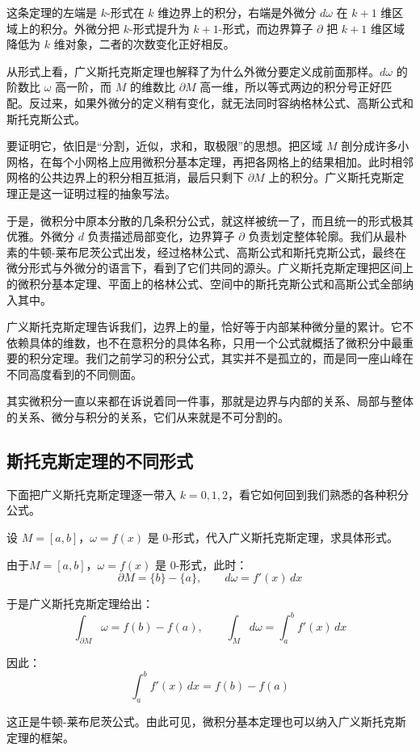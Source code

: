 这条定理的左端是 \(k\)-形式在 \(k\) 维边界上的积分，右端是外微分 \(d\omega\) 在 \(k+1\) 维区域上的积分。外微分把 \(k\)-形式提升为 \(k+1\)-形式，而边界算子 \(\partial\) 把 \(k+1\) 维区域降低为 \(k\) 维对象，二者的次数变化正好相反。

从形式上看，广义斯托克斯定理也解释了为什么外微分要定义成前面那样。\(d\omega\) 的阶数比 \(\omega\) 高一阶，而 \(M\) 的维数比 \(\partial M\) 高一维，所以等式两边的积分号正好匹配。反过来，如果外微分的定义稍有变化，就无法同时容纳格林公式、高斯公式和斯托克斯公式。

要证明它，依旧是“分割，近似，求和，取极限”的思想。把区域 \(M\) 剖分成许多小网格，在每个小网格上应用微积分基本定理，再把各网格上的结果相加。此时相邻网格的公共边界上的积分相互抵消，最后只剩下 \(\partial M\) 上的积分。广义斯托克斯定理正是这一证明过程的抽象写法。

于是，微积分中原本分散的几条积分公式，就这样被统一了，而且统一的形式极其优雅。外微分 \(d\) 负责描述局部变化，边界算子 \(\partial\) 负责划定整体轮廓。我们从最朴素的牛顿-莱布尼茨公式出发，经过格林公式、高斯公式和斯托克斯公式，最终在微分形式与外微分的语言下，看到了它们共同的源头。广义斯托克斯定理把区间上的微积分基本定理、平面上的格林公式、空间中的斯托克斯公式和高斯公式全部纳入其中。

广义斯托克斯定理告诉我们，边界上的量，恰好等于内部某种微分量的累计。它不依赖具体的维数，也不在意积分的具体名称，只用一个公式就概括了微积分中最重要的积分定理。我们之前学习的积分公式，其实并不是孤立的，而是同一座山峰在不同高度看到的不同侧面。

其实微积分一直以来都在诉说着同一件事，那就是边界与内部的关系、局部与整体的关系、微分与积分的关系，它们从来就是不可分割的。
\subsection{斯托克斯定理的不同形式}
下面把广义斯托克斯定理逐一带入 \(k=0,1,2\)，看它如何回到我们熟悉的各种积分公式。

\begin{myexample}
  设 \(M=[a,b]\)，\(\omega=f(x)\) 是 \(0\)-形式，代入广义斯托克斯定理，求具体形式。
  
  由于\(M=[a,b]\)，\(\omega=f(x)\) 是 \(0\)-形式，此时：
\[
\partial M=\{b\}-\{a\},\qquad d\omega=f'(x)\,dx
\]

于是广义斯托克斯定理给出：
\[
\int_{\partial M}\omega=f(b)-f(a),
\qquad
\int_M d\omega=\int_a^b f'(x)\,dx
\]

因此：
\[
\int_a^b f'(x)\,dx=f(b)-f(a)
\]

这正是牛顿-莱布尼茨公式。由此可见，微积分基本定理也可以纳入广义斯托克斯定理的框架。
\end{myexample}

